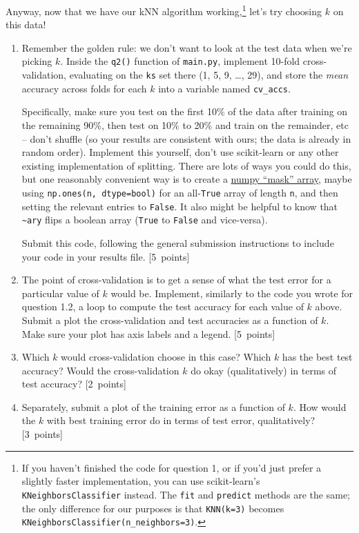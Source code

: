 \documentclass{article}
\newcommand{\blu}[1]{{\textcolor{blu}{#1}}}
\let\ask\blu
\newcommand\pts[1]{\textcolor{pointscolour}{[#1~points]}}
\begin{document}
    Anyway, now that we have our kNN algorithm working,\footnote{If you haven't finished the code for question 1, or if you'd just prefer a slightly faster implementation, you can use scikit-learn's \texttt{KNeighborsClassifier} instead. The \texttt{fit} and \texttt{predict} methods are the same; the only difference for our purposes is that \texttt{KNN(k=3)} becomes \texttt{KNeighborsClassifier(n\_neighbors=3)}.} let's try choosing $k$ on this data!

    \begin{enumerate}
        \item Remember the golden rule: we don't want to look at the test data when we're picking $k$. Inside the \texttt{q2()} function of \texttt{main.py}, implement 10-fold cross-validation, evaluating on the \texttt{ks} set there (1, 5, 9, \dots, 29), and store the \emph{mean} accuracy across folds for each $k$ into a variable named \texttt{cv\_accs}.

        Specifically, make sure you test on the first 10\% of the data after training on the remaining 90\%, then test on 10\% to 20\% and train on the remainder, etc -- don't shuffle (so your results are consistent with ours; the data is already in random order). Implement this yourself, don't use scikit-learn or any other existing implementation of splitting. There are lots of ways you could do this, but one reasonably convenient way is to create a \href{https://numpy.org/doc/stable/user/basics.indexing.html#boolean-or-mask-index-arrays}{numpy ``mask'' array}, maybe using \texttt{np.ones(n, dtype=bool)} for an all-\texttt{True} array of length \texttt{n}, and then setting the relevant entries to \texttt{False}. It also might be helpful to know that \texttt{\textasciitilde ary} flips a boolean array (\texttt{True} to \texttt{False} and vice-versa).

        \ask{Submit this code}, following the general submission instructions to include your code in your results file. \pts{5}

        

        \item The point of cross-validation is to get a sense of what the test error for a particular value of $k$ would be. Implement, similarly to the code you wrote for question 1.2, a loop to compute the test accuracy for each value of $k$ above. \ask{Submit a plot the cross-validation and test accuracies as a function of $k$.} Make sure your plot has axis labels and a legend. \pts{5}


        \item Which $k$ would cross-validation choose in this case? Which $k$ has the best test accuracy? Would the cross-validation $k$ do okay (qualitatively) in terms of test accuracy? \pts{2}


        \item Separately, \ask{submit a plot of the training error as a function of $k$. How would the $k$ with best training error do in terms of test error, qualitatively?} \pts{3}
    \end{enumerate}
\end{document}
